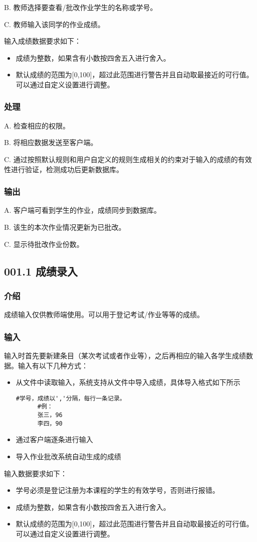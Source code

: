 B. 教师选择要查看/批改作业学生的名称或学号。

C. 教师输入该同学的作业成绩。

输入成绩数据要求如下：
  \begin{itemize}
   \item 成绩为整数，如果含有小数按四舍五入进行舍入。
   \item 默认成绩的范围为[0,100]，超过此范围进行警告并且自动取最接近的可行值。可以通过自定义设置进行调整。
 \end{itemize}
\subsubsection{处理}
A. 检查相应的权限。

B. 将相应数据发送至客户端。

C. 通过按照默认规则和用户自定义的规则生成相关的约束对于输入的成绩的有效性进行验证，检测成功后更新数据库。

\subsubsection{输出}
A. 客户端可看到学生的作业，成绩同步到数据库。

B. 该生的本次作业情况更新为已批改。

C. 显示待批改作业份数。

  \subsection{001.1 成绩录入}
    \subsubsection{介绍}
    成绩输入仅供教师端使用。可以用于登记考试/作业等等的成绩。
    \subsubsection{输入}
    输入时首先要新建条目（某次考试或者作业等），之后再相应的输入各学生成绩数据。输入有以下几种方式：
    \begin{itemize}
      \item 从文件中读取输入，系统支持从文件中导入成绩，具体导入格式如下所示
      \begin{lstlisting}[caption=文件导入成绩示例, label={code:import_grade_from_file}]
      #学号，成绩以','分隔，每行一条记录。
      #例：
      张三，96
      李四，90
      \end{lstlisting}
      \item 通过客户端逐条进行输入
      \item 导入作业批改系统自动生成的成绩
    \end{itemize}
    输入数据要求如下：
    \begin{itemize}
      \item 学号必须是登记注册为本课程的学生的有效学号，否则进行报错。
      \item 成绩为整数，如果含有小数按四舍五入进行舍入。
      \item 默认成绩的范围为[0,100]，超过此范围进行警告并且自动取最接近的可行值。可以通过自定义设置进行调整。
    \end{itemize}
